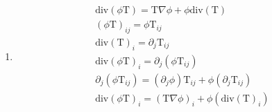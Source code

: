 \begin{problem}
\begin{enumerate}
\begin{enumerate}
                \item \begin{align}
                    \text{div}(\phi \text{T})=\text{T}\nabla \phi+\phi \text{div}(\text{T}) \\
                    (\phi \text{T})_{ij}=\phi \text{T}_{ij} \\
                    \text{div}(\text{T})_{i}=\partial_{j}\text{T}_{ij} \\
                    \text{div}(\phi \text{T})_{i}=\partial_{j}(\phi \text{T}_{ij}) \\
                    \partial_{j}(\phi \text{T}_{ij})=(\partial_{j}\phi)\text{T}_{ij}+\phi(\partial_{j}\text{T}_{ij}) \\
                    \text{div}(\phi \text{T})_{i}=(\text{T}\nabla \phi)_{i}+\phi(\text{div}(\text{T})_{i}) \\
                    \end{align}


\end{enumerate}
\end{enumerate}
\end{problem}
